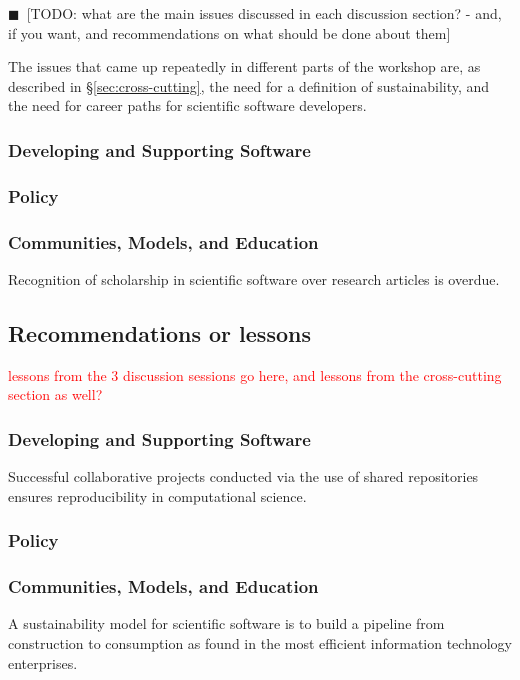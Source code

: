 \documentclass[11pt, oneside]{amsart}
\newcommand{\todo}[1]{{\color{blue}$\blacksquare$~\textsf{[TODO: #1]}}}
\newcommand{\note}[1]{ {\textcolor{red}    { #1 }}}
\begin{document}
\todo{what are the main issues discussed in each discussion section? - and, if you want, and recommendations on what should be done about them}

The issues that came up repeatedly in different parts of the workshop are, as described in
\S\ref{sec:cross-cutting}, the need for a definition of sustainability, and the need for
career paths for scientific software developers.

\subsubsection*{Developing and Supporting Software}

\subsubsection*{Policy}

\subsubsection*{Communities, Models, and Education}

Recognition of scholarship in scientific software over research 
articles is overdue.


\subsection{Recommendations or lessons}

\note{lessons from the 3 discussion sessions go here, and lessons from the cross-cutting section as well?}


\subsubsection*{Developing and Supporting Software}

Successful collaborative projects conducted via the use of shared
repositories ensures reproducibility in computational science.

\subsubsection*{Policy}

\subsubsection*{Communities, Models, and Education}
A sustainability model for scientific software is to build a pipeline
from construction to consumption as found in the most efficient
information technology enterprises.
\end{document}

